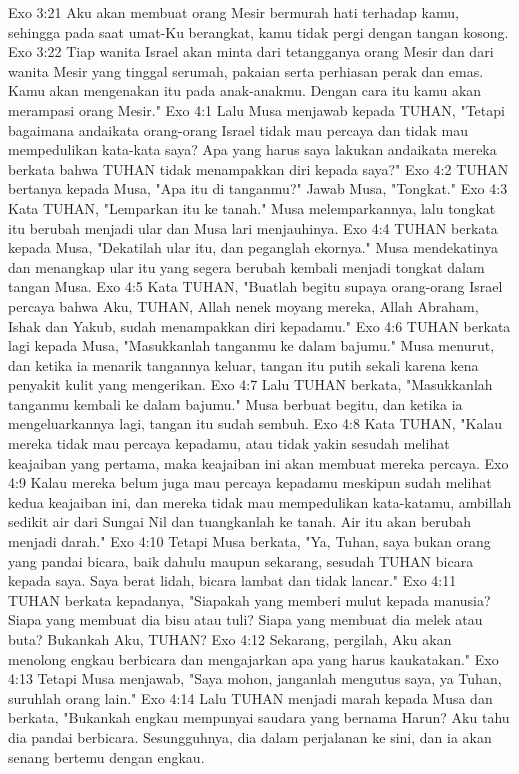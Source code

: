 Exo 3:21  Aku akan membuat orang Mesir bermurah hati terhadap kamu, sehingga pada saat umat-Ku berangkat, kamu tidak pergi dengan tangan kosong.
Exo 3:22  Tiap wanita Israel akan minta dari tetangganya orang Mesir dan dari wanita Mesir yang tinggal serumah, pakaian serta perhiasan perak dan emas. Kamu akan mengenakan itu pada anak-anakmu. Dengan cara itu kamu akan merampasi orang Mesir."
Exo 4:1  Lalu Musa menjawab kepada TUHAN, "Tetapi bagaimana andaikata orang-orang Israel tidak mau percaya dan tidak mau mempedulikan kata-kata saya? Apa yang harus saya lakukan andaikata mereka berkata bahwa TUHAN tidak menampakkan diri kepada saya?"
Exo 4:2  TUHAN bertanya kepada Musa, "Apa itu di tanganmu?" Jawab Musa, "Tongkat."
Exo 4:3  Kata TUHAN, "Lemparkan itu ke tanah." Musa melemparkannya, lalu tongkat itu berubah menjadi ular dan Musa lari menjauhinya.
Exo 4:4  TUHAN berkata kepada Musa, "Dekatilah ular itu, dan peganglah ekornya." Musa mendekatinya dan menangkap ular itu yang segera berubah kembali menjadi tongkat dalam tangan Musa.
Exo 4:5  Kata TUHAN, "Buatlah begitu supaya orang-orang Israel percaya bahwa Aku, TUHAN, Allah nenek moyang mereka, Allah Abraham, Ishak dan Yakub, sudah menampakkan diri kepadamu."
Exo 4:6  TUHAN berkata lagi kepada Musa, "Masukkanlah tanganmu ke dalam bajumu." Musa menurut, dan ketika ia menarik tangannya keluar, tangan itu putih sekali karena kena penyakit kulit yang mengerikan.
Exo 4:7  Lalu TUHAN berkata, "Masukkanlah tanganmu kembali ke dalam bajumu." Musa berbuat begitu, dan ketika ia mengeluarkannya lagi, tangan itu sudah sembuh.
Exo 4:8  Kata TUHAN, "Kalau mereka tidak mau percaya kepadamu, atau tidak yakin sesudah melihat keajaiban yang pertama, maka keajaiban ini akan membuat mereka percaya.
Exo 4:9  Kalau mereka belum juga mau percaya kepadamu meskipun sudah melihat kedua keajaiban ini, dan mereka tidak mau mempedulikan kata-katamu, ambillah sedikit air dari Sungai Nil dan tuangkanlah ke tanah. Air itu akan berubah menjadi darah."
Exo 4:10  Tetapi Musa berkata, "Ya, Tuhan, saya bukan orang yang pandai bicara, baik dahulu maupun sekarang, sesudah TUHAN bicara kepada saya. Saya berat lidah, bicara lambat dan tidak lancar."
Exo 4:11  TUHAN berkata kepadanya, "Siapakah yang memberi mulut kepada manusia? Siapa yang membuat dia bisu atau tuli? Siapa yang membuat dia melek atau buta? Bukankah Aku, TUHAN?
Exo 4:12  Sekarang, pergilah, Aku akan menolong engkau berbicara dan mengajarkan apa yang harus kaukatakan."
Exo 4:13  Tetapi Musa menjawab, "Saya mohon, janganlah mengutus saya, ya Tuhan, suruhlah orang lain."
Exo 4:14  Lalu TUHAN menjadi marah kepada Musa dan berkata, "Bukankah engkau mempunyai saudara yang bernama Harun? Aku tahu dia pandai berbicara. Sesungguhnya, dia dalam perjalanan ke sini, dan ia akan senang bertemu dengan engkau.
